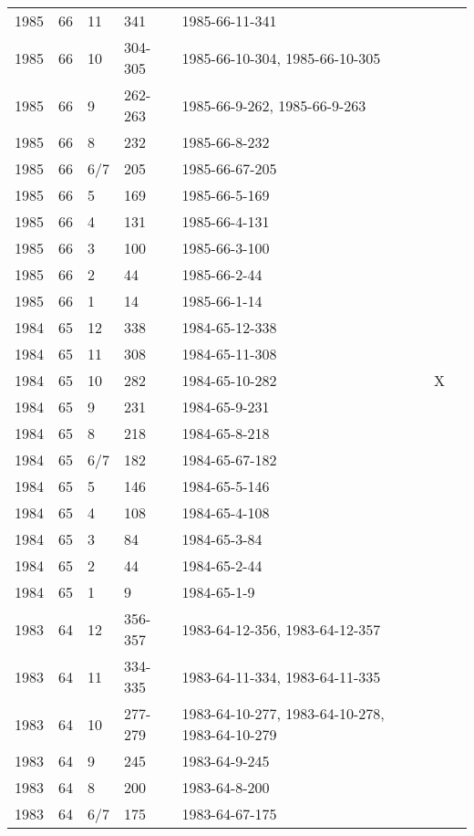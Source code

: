 \begin{longtable}{ |l|l|l|l|p{2.7cm}|l|p{2cm}| }
 1985 & 66 &    11 &    341  & 1985-66-11-341 &  & \\
 1985 & 66 &    10 & 304-305 & 1985-66-10-304, 1985-66-10-305 &  & \\
 1985 & 66 &     9 & 262-263 & 1985-66-9-262, 1985-66-9-263 &  & \\
 1985 & 66 &     8 &    232  & 1985-66-8-232  &  & \\
 1985 & 66 &   6/7 &    205  & 1985-66-67-205 &  & \\
 1985 & 66 &     5 &    169  & 1985-66-5-169  &  & \\
 1985 & 66 &     4 &   131   & 1985-66-4-131  &  & \\
 1985 & 66 &     3 &   100   & 1985-66-3-100  &  & \\
 1985 & 66 &     2 &     44  & 1985-66-2-44   &  & \\
 1985 & 66 &     1 &    14   & 1985-66-1-14   &  & \\
 1984 & 65 &    12 &    338  & 1984-65-12-338 &  & \\
 1984 & 65 &    11 &    308  & 1984-65-11-308 &  & \\
 1984 & 65 &    10 &     282 & 1984-65-10-282 & X & \\
 1984 & 65 &     9 &    231  & 1984-65-9-231  &  & \\
 1984 & 65 &     8 &    218  & 1984-65-8-218  &  & \\
 1984 & 65 &   6/7 &    182  & 1984-65-67-182 &  & \\
 1984 & 65 &     5 &    146  & 1984-65-5-146  &  & \\
 1984 & 65 &     4 &    108  & 1984-65-4-108  &  & \\
 1984 & 65 &     3 &     84  & 1984-65-3-84   &  & \\
 1984 & 65 &     2 &     44  & 1984-65-2-44   &  & \\
 1984 & 65 &     1 &     9   & 1984-65-1-9    &  & \\
 1983 & 64 &    12 & 356-357 &  1983-64-12-356, 1983-64-12-357 &  & \\
 1983 & 64 &    11 & 334-335 & 1983-64-11-334, 1983-64-11-335 &  & \\
 1983 & 64 &    10 & 277-279 & 1983-64-10-277, 1983-64-10-278, 1983-64-10-279 &  & \\
 1983 & 64 &     9 &   245   & 1983-64-9-245  &  & \\
 1983 & 64 &     8 &    200  & 1983-64-8-200  &  & \\
 1983 & 64 &   6/7 &   175   & 1983-64-67-175 &  & \\

\end{longtable}
